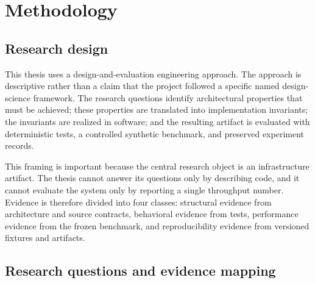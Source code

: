 \chapter{Methodology}

\section{Research design}

This thesis uses a design-and-evaluation engineering approach. The approach is descriptive rather than a claim that the project followed a specific named design-science framework. The research questions identify architectural properties that must be achieved; these properties are translated into implementation invariants; the invariants are realized in software; and the resulting artifact is evaluated with deterministic tests, a controlled synthetic benchmark, and preserved experiment records.

This framing is important because the central research object is an infrastructure artifact. The thesis cannot answer its questions only by describing code, and it cannot evaluate the system only by reporting a single throughput number. Evidence is therefore divided into four classes: structural evidence from architecture and source contracts, behavioral evidence from tests, performance evidence from the frozen benchmark, and reproducibility evidence from versioned fixtures and artifacts.

\section{Research questions and evidence mapping}

